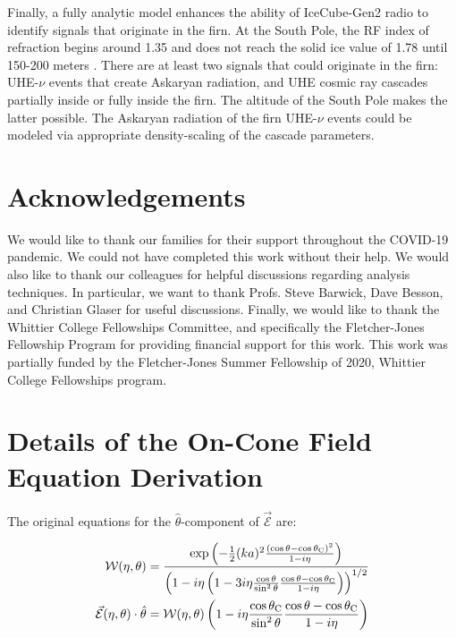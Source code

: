 \documentclass[amsmath,amssymb,aps,prd,10pt,twocolumn]{revtex4}
\begin{document}
Finally, a fully analytic model enhances the ability of IceCube-Gen2 radio to identify signals that originate in the firn.  At the South Pole, the RF index of refraction begins around 1.35 and does not reach the solid ice value of 1.78 until 150-200 meters \cite{Barwick:2018497}.  There are at least two signals that could originate in the firn: UHE-$\nu$ events that create Askaryan radiation, and UHE cosmic ray cascades partially inside or fully inside the firn.  The altitude of the South Pole makes the latter possible.  The Askaryan radiation of the firn UHE-$\nu$ events could be modeled via appropriate density-scaling of the cascade parameters.

\section{Acknowledgements}

We would like to thank our families for their support throughout the COVID-19 pandemic.  We could not have completed this work without their help.  We would also like to thank our colleagues for helpful discussions regarding analysis techniques.  In particular, we want to thank Profs. Steve Barwick, Dave Besson, and Christian Glaser for useful discussions.  Finally, we would like to thank the Whittier College Fellowships Committee, and specifically the Fletcher-Jones Fellowship Program for providing financial support for this work.  This work was partially funded by the Fletcher-Jones Summer Fellowship of 2020, Whittier College Fellowships program.

\appendix

\section{Details of the On-Cone Field Equation Derivation}
\label{app:a}

The original equations for the $\hat{\theta}$-component of $\vec{\mathcal{E}}$ are:

\begin{align}
\mathcal{W}(\eta,\theta) &= \frac{\exp\left( -\frac{1}{2}(ka)^2 \frac{(\cos\theta - \cos\theta_{\rm C})^2}{1-i\eta} \right)}{\left(1-i\eta\left(1-3i\eta \frac{\cos\theta}{\sin^2\theta}\frac{\cos\theta - \cos\theta_{\rm C}}{1-i\eta}\right) \right)^{1/2}} \\
\vec{\mathcal{E}}(\eta,\theta) \cdot \hat{\theta} &= \mathcal{W}(\eta,\theta) \left(1-i\eta \frac{\cos\theta_{\rm C}}{\sin^2\theta} \frac{\cos\theta - \cos\theta_{\rm C}}{1-i\eta} \right) \label{app:eq:big_one_1}
\end{align}
\end{document}
